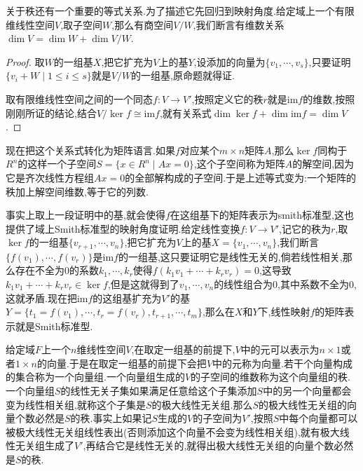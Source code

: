 关于秩还有一个重要的等式关系.为了描述它先回归到映射角度.给定域上一个有限维线性空间$V$,取子空间$W$,那么有商空间$V/W$,我们断言有维数关系$\dim V=\dim W+\dim V/W$.
\begin{proof}
	
	取$W$的一组基$X$,把它扩充为$V$上的基$Y$,设添加的向量为$\{v_1,\cdots,v_s\}$,只要证明$\{v_i+W\mid 1\le i\le s\}$就是$V/W$的一组基,原命题就得证.
	
	取有限维线性空间之间的一个同态$f:V\to V'$,按照定义它的秩$r$就是$\mathrm{im}f$的维数,按照刚刚所证的结论,结合$V/\ker f\cong\mathrm{im}f$,就有关系式$\dim\ker f+\dim\mathrm{im}f=\dim V$.
\end{proof}

现在把这个关系式转化为矩阵语言.如果$f$对应某个$m\times n$矩阵$A$,那么$\ker f$同构于$R^n$的这样一个子空间$S=\{x\in R^n\mid Ax=0\}$,这个子空间称为矩阵$A$的解空间,因为它是齐次线性方程组$Ax=0$的全部解构成的子空间.于是上述等式变为:一个矩阵的秩加上解空间维数,等于它的列数.

事实上取上一段证明中的基,就会使得$f$在这组基下的矩阵表示为smith标准型,这也提供了域上Smith标准型的映射角度证明.给定线性变换$f:V\to V'$,记它的秩为$r$,取$\ker f$的一组基$\{v_{r+1},\cdots,v_n\}$,把它扩充为$V$上的基$X=\{v_1,\cdots,v_n\}$,我们断言$\{f(v_1),\cdots,f(v_r)\}$是$\mathrm{im}f$的一组基,这只要证明它是线性无关的,倘若线性相关,那么存在不全为0的系数$k_1,\cdots,k_r$使得$f(k_1v_1+\cdots+k_rv_r)=0$,这导致$k_1v_1+\cdots+k_rv_r\in\ker f$,但是这就得到了$v_1,\cdots,v_n$的线性组合为0,其中系数不全为0,这就矛盾.现在把$\mathrm{im}f$的这组基扩充为$V'$的基$Y=\{t_1=f(v_1),\cdots,t_r=f(v_r),t_{r+1},\cdots,t_m\}$,那么在$X$和$Y$下,线性映射$f$的矩阵表示就是Smith标准型.

给定域$F$上一个$n$维线性空间$V$,在取定一组基的前提下,$V$中的元可以表示为$n\times1$或者$1\times n$的向量.于是在取定一组基的前提下会把$V$中的元称为向量.若干个向量构成的集合称为一个向量组.一个向量组生成的$V$的子空间的维数称为这个向量组的秩.一个向量组$S$的线性无关子集如果满足任意给这个子集添加$S$中的另一个向量都会变为线性相关组,就称这个子集是$S$的极大线性无关组.那么$S$的极大线性无关组的向量个数必然是$S$的秩.事实上如果记$S$生成的$V$的子空间为$V'$,按照$S$中每个向量都可以被极大线性无关组线性表出(否则添加这个向量不会变为线性相关组),就有极大线性无关组生成了$V'$,再结合它是线性无关的,就得出极大线性无关组的向量个数必然是$S$的秩.

